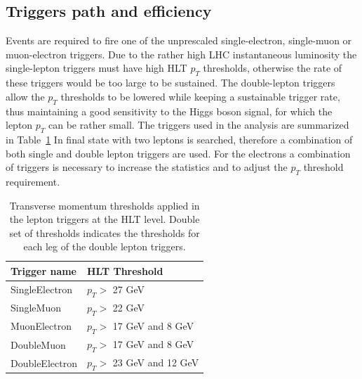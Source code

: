 \subsection*{Triggers path and  efficiency}
Events are required to fire one of the unprescaled single-electron, single-muon or
muon-electron triggers. Due to the rather high LHC instantaneous luminosity the
single-lepton triggers must have high HLT $p_T$ thresholds, otherwise the rate of these
triggers would be too large to be sustained. The double-lepton triggers allow the $p_T$
thresholds to be lowered while keeping a sustainable trigger rate, thus maintaining a
good sensitivity to the Higgs boson signal, for which the lepton  $p_T$ can be rather small.
The triggers used in the analysis are summarized in Table~\ref{tab:triggers} 
In final state with two leptons is searched, therefore a combination of both single and double lepton triggers are used. 
For the electrons a combination of triggers is necessary to increase the statistics and to adjust the $p_T$ threshold requirement. 
\begin{table}
\begin{center}
\begin{tabular}{|l|l|}
   \hline
   Trigger name & HLT Threshold \\
   \hline
   
   SingleElectron & $p_T>$ 27 GeV  \\

   \hline
        
   SingleMuon   &  $p_T>$ 22 GeV  \\

   \hline
   
   MuonElectron       &  $p_T>$ 17 GeV  and 8 GeV  \\
   
   \hline
   
   DoubleMuon   & $p_T>$ 17 GeV  and 8 GeV  \\
      
   \hline
   
   DoubleElectron   &  $p_T>$ 23 GeV  and 12 GeV    \\
   
   \hline
\end{tabular}
\caption{Transverse momentum thresholds applied in the lepton triggers at the HLT
level. Double set of thresholds indicates the thresholds for each leg of the double lepton
triggers.}
\label{tab:triggers}  
\end{center}
\end{table}\\
